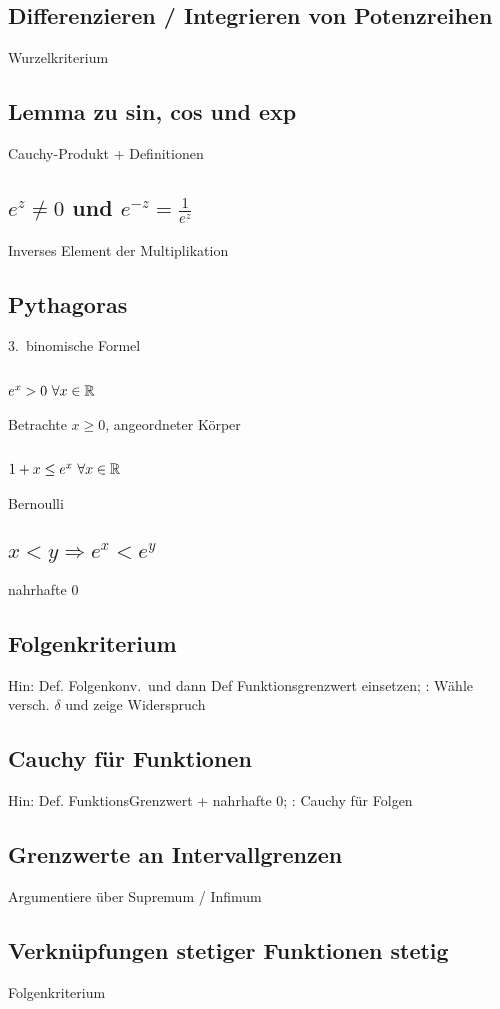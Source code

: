 \subsection{Differenzieren / Integrieren von Potenzreihen}
 Wurzelkriterium
\subsection{Lemma zu sin, cos und exp }
 Cauchy-Produkt + Definitionen
\subsection{$e^z \neq 0$ und $e^{-z} = \frac{1}{e^{z}}$ }
 Inverses Element der Multiplikation
\subsection{Pythagoras }
 3.\ binomische Formel
\subsection{$e^x > 0\ \forall x \in \R$ }
 Betrachte $x \geq 0$, angeordneter Körper
\subsection{$1+x \leq e^x\ \forall x \in \R$ }
 Bernoulli
\subsection{$x<y \Rightarrow e^x < e^y$ }
 nahrhafte 0
\subsection{Folgenkriterium }
 Hin: Def. Folgenkonv.\ und dann Def Funktionsgrenzwert einsetzen; : Wähle versch. $\delta$ und zeige Widerspruch
\subsection{Cauchy für Funktionen }
 Hin: Def. FunktionsGrenzwert + nahrhafte 0; : Cauchy für Folgen
\subsection{Grenzwerte an Intervallgrenzen }
 Argumentiere über Supremum / Infimum
\subsection{Verknüpfungen stetiger Funktionen stetig }
 Folgenkriterium

